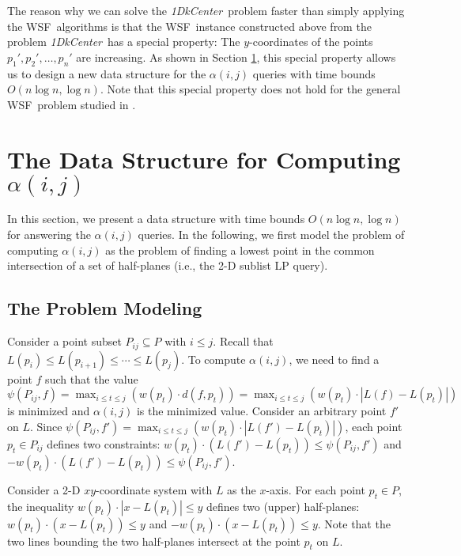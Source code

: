 \documentclass{llncs}
\def\wsf{WSF}
\def\problem{{\it 1DkCenter}}
\def\sectionspace{\vspace*{-0.10in}}
\begin{document}
The reason why we can solve the \problem\ problem faster than simply applying
the \wsf\ algorithms \cite{ref:ChenAp091} is that the
\wsf\ instance constructed above from the problem \problem\ has a special property: The
$y$-coordinates of the points $p_1',p_2',\ldots,p_n'$ are increasing.
As shown in Section \ref{sec:chreduction}, this
special property allows us to design a new data structure for the $\alpha(i,j)$
queries with time bounds $O(n\log n, \log n)$.
Note that this special property does not hold for the general \wsf\
problem studied in \cite{ref:ChenAp091}.








\section{The Data Structure for Computing $\alpha(i,j)$}
\label{sec:chreduction}


In this section, we present a data structure with time bounds
$O(n\log n, \log n)$ for answering the $\alpha(i,j)$ queries.
In the following, we first model the problem of computing $\alpha(i,j)$
as the problem of finding a lowest point in the common
intersection of a set of half-planes (i.e., the 2-D sublist LP query).

\sectionspace
\subsection{The Problem Modeling}

Consider a point subset $P_{ij}\subseteq P$ with $i\leq j$. Recall that
$L(p_i)\leq L(p_{i+1})\leq\cdots\leq L(p_j)$. To compute $\alpha(i,j)$, we
need to find a point $f$ such that the value $\psi(P_{ij},f)=
\max_{i\leq t\leq j}(w(p_t)\cdot
d(f,p_t))=\max_{i\leq t\leq j}(w(p_t)\cdot|L(f)-L(p_t)|)$ is minimized and
$\alpha(i,j)$ is the minimized value.
Consider an arbitrary point $f'$ on $L$.
Since $\psi(P_{ij},f') =
\max_{i\leq t\leq j}(w(p_t)\cdot|L(f')-L(p_t)|)$, each point
$p_t\in P_{ij}$ defines two constraints:
$w(p_t)\cdot (L(f')-L(p_t))\leq \psi(P_{ij},f')$ and
$-w(p_t)\cdot (L(f')-L(p_t))\leq \psi(P_{ij},f')$.

Consider a 2-D $xy$-coordinate system with $L$ as the $x$-axis. For each
point $p_t\in P$, the inequality $w(p_t)\cdot|x-L(p_t)|\leq y$ defines
two (upper) half-planes: $w(p_t)\cdot (x-L(p_t))\leq y$ and $-w(p_t)\cdot
(x-L(p_t))\leq y$.  Note that the two lines bounding the two half-planes
intersect at the point $p_t$ on $L$.
\end{document}
